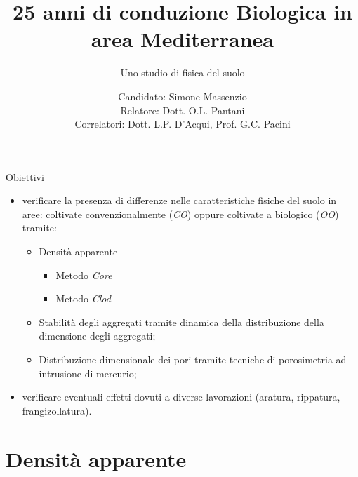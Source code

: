 \documentclass[10pt]{beamer}
\title[25 anni di conduzione Biologica in
area Mediterranea. ] %
{ %
  25 anni di  conduzione Biologica  in
  area Mediterranea}
\subtitle[Uno studio di fisica del suolo]
{
  Uno studio di fisica del suolo
}
\author[Simone Massenzio]
{ 
  Candidato: Simone Massenzio \\
  Relatore: Dott. O.L. Pantani\\
  \vspace{0.1cm}
  Correlatori:
  Dott. L.P. D'Acqui, Prof. G.C. Pacini}
\institute[] { \emph{Dipartimento di Scienze della Produzioni Animali e
    dell'Ambiente\\
    Universit\`a degli studi di Firenze - UniFI\\}
  
}
\date{\displaydate{date}}
\begin{document}
{\1
  \begin{frame}[noframenumbering]%
    \titlepage
  \end{frame}}







\begin{frame}{Obiettivi}{}

\large
\begin{itemize}[<+->]
\item verificare la presenza di differenze nelle caratteristiche
  fisiche del suolo in aree: coltivate convenzionalmente (\emph{CO})
  oppure coltivate a biologico (\emph{OO}) tramite:
  \begin{itemize}
  \item Densit\`a apparente
    \begin{itemize}
    \item Metodo \emph{Core}
    \item Metodo \emph{Clod}
    \end{itemize}
  \item Stabilit\`a degli aggregati tramite dinamica della
    distribuzione della dimensione degli aggregati;
  \item Distribuzione dimensionale dei pori tramite tecniche di
    porosimetria ad intrusione di mercurio;      
  \end{itemize}
\item verificare eventuali effetti dovuti a diverse lavorazioni
  (aratura, rippatura, frangizollatura).
\end{itemize}
\end{frame}

\section{Densit\`a apparente}
\end{document}
